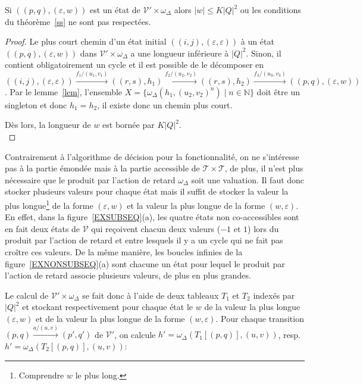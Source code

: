 		\begin{lemma}
			Si $((p,q),(\varepsilon,w))$ est un état de $\mathscr{V'} \times \omega_\Delta$ alors $|w| \leq K|Q|^2$ ou les conditions du théorème~\ref{ss} ne sont pas respectées.
			\label{lem3}
		\end{lemma}
		\begin{proof}
			Le plus court chemin d'un état initial $((i,j),(\varepsilon,\varepsilon))$ à un état $((p,q),(\varepsilon,w))$ dans $\mathscr{V'} \times \omega_\Delta$ a une longueur inférieure à $|Q|^2$. Sinon, il contient obligatoirement un cycle et il est possible de le décomposer en
			\begin{equation*}
				((i,j),(\varepsilon,\varepsilon)) \xrightarrow{f_1/(u_1,v_1)} ((r,s),h_1) \xrightarrow{f_2/(u_2,v_2)} ((r,s),h_2) \xrightarrow{f_3/(u_3,v_3)} ((p,q),(\varepsilon,w))
			\end{equation*}.
			Par le lemme~\ref{lem}, l'ensemble $X = \{\omega_\Delta(h_1,(u_2,v_2)^n) \mid n \in \mathbb{N}\}$ doit être un singleton et donc $h_1 = h_2$, il existe donc un chemin plus court.
			
			Dès lors, la longueur de $w$ est bornée par $K|Q|^2$. \\
		\end{proof}
		
		Contrairement à l'algorithme de décision pour la fonctionnalité, on ne s'intéresse pas à la partie émondée mais à la partie accessible de $\mathscr{T} \times \mathscr{T}$, de plus, il n'est plus nécessaire que le produit par l'action de retard $\omega_\Delta$ soit une valuation. Il faut donc stocker plusieurs valeurs pour chaque état mais il suffit de stocker la valeur la plus longue\footnote{Comprendre $w$ le plus long.} de la forme $(\varepsilon, w)$ et la valeur la plus longue de la forme $(w, \varepsilon)$. En effet, dans la figure~\ref{EXSUBSEQ}(a), les quatre états non co-accessibles sont en fait deux états de $\mathscr{V}$ qui reçoivent chacun deux valeurs ($-1$ et $1$) lors du produit par l'action de retard et entre lesquels il y a un cycle qui ne fait pas croître ces valeurs. De la même manière, les boucles infinies de la figure~\ref{EXNONSUBSEQ}(a) sont chacune un état pour lequel le produit par l'action de retard associe plusieurs valeurs, de plus en plus grandes.
		
		Le calcul de $\mathscr{V'} \times \omega_\Delta$ se fait donc à l'aide de deux tableaux $T_1$ et $T_2$ indexés par $|Q|^2$ et stockant respectivement pour chaque état le $w$ de la valeur la plus longue $(\varepsilon, w)$ et de la valeur la plus longue de la forme $(w, \varepsilon)$. Pour chaque transition $(p,q) \xrightarrow{a/(u,v)} (p',q')$ de $\mathscr{V'}$, on calcule $h' = \omega_\Delta(T_1[(p,q)],(u,v))$, resp. $h' = \omega_\Delta(T_2[(p,q)],(u,v))$:
		

